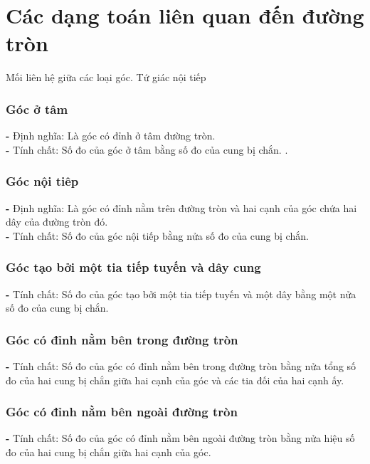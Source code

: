 \section{Các dạng toán liên quan đến đường tròn}
\begin{dang}{Mối liên hệ giữa các loại góc. Tứ giác nội tiếp}
	\subsubsection{Góc ở tâm}
	\textbf{-} Định nghĩa: Là góc có đỉnh ở tâm đường tròn.\\
	\textbf{-} Tính chất: Số đo của góc ở tâm bằng số đo của cung bị chắn. .
	\subsubsection{Góc nội tiêp}
	\textbf{-} Định nghĩa: Là góc có đỉnh nằm trên đường tròn và hai cạnh của góc chứa hai dây của đường tròn đó.\\
	\textbf{-} Tính chất: Số đo của góc nội tiếp bằng nửa số đo của cung bị chắn.
	\subsubsection{Góc tạo bởi một tia tiếp tuyến và dây cung}
	\textbf{-} Tính chất: Số đo của góc tạo bởi một tia tiếp tuyến và một dây bằng một nửa số đo của cung bị chắn.
	\subsubsection{Góc có đỉnh nằm bên trong đường tròn}
	\textbf{-} Tính chất: Số đo của góc có đỉnh nằm bên trong đường tròn bằng nửa tổng số đo của hai cung bị chắn giữa hai cạnh của góc và các tia đối của hai cạnh ấy.
	\subsubsection{Góc có đỉnh nằm bên ngoài đường tròn}
	\textbf{-} Tính chất: Số đo của góc có đỉnh nằm bên ngoài đường tròn bằng nửa hiệu số đo của hai cung bị chắn giữa hai cạnh của góc.

\end{dang}
